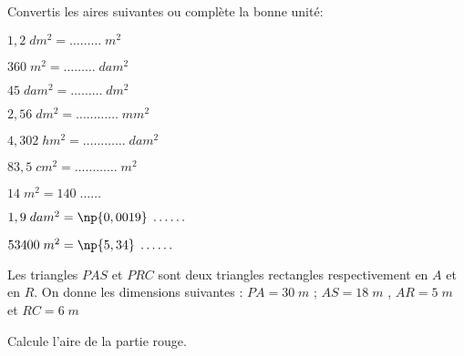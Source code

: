 \begin{pageAuto}
\begin{minipage}{0.38\linewidth}
\end{minipage}

 
 \ExoAuto
 

Convertis les aires suivantes ou complète la bonne unité:\vspace{0.4cm}

\begin{minipage}{0.25\linewidth}
$1,2\; dm^2 =  \ldots\ldots\ldots \;m^2$ \vspace{0.4cm}
 
$360\; m^2  =\ldots\ldots\ldots \;dam^2$\vspace{0.4cm}
 
$45\; dam^2  = \ldots\ldots\ldots  \;dm^2$
 
\end{minipage}
\hfill
\begin{minipage}{0.33\linewidth}
 
$2,56 \;dm^2  = \ldots \ldots\ldots\ldots\;  mm^2$\vspace{0.4cm}
 
$4,302\; hm^2  = \ldots \ldots\ldots\ldots  \; dam^2$\vspace{0.4cm}

$83,5\; cm^2  =  \ldots \ldots\ldots\ldots\; m^2$
 \end{minipage}
\hfill
\begin{minipage}{0.28\linewidth}
 
$14\; m^2  = 140 \; \ldots \ldots$\vspace{0.4cm}
 
$1,9 \;dam^2  = \np{0,0019}\; \ldots \ldots $\vspace{0.4cm}

$53400 \;m^2  = \np{5,34}\; \ldots \ldots  $
 \end{minipage}


   
\ExoAuto
 

\begin{minipage}{0.58\linewidth}

Les triangles $PAS$ et $PRC$ sont deux triangles rectangles respectivement en $A$ et en $R$. On donne les dimensions suivantes : 
$PA =30 \; m$ ; $AS = 18 \; m$ , $AR = 5\; m$ et $RC = 6\; m$ 

Calcule l'aire de la partie rouge. 
\end{minipage}
\hfill
\begin{minipage}{0.38\linewidth}


\end{minipage}
\end{pageAuto}
